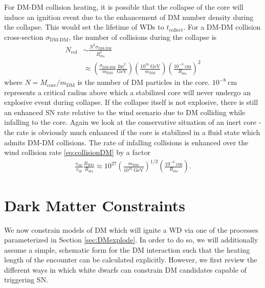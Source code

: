 \documentclass[preprintnumbers,amsmath,amssymb,prd, superscriptaddress,twocolumn]{revtex4}
\newcommand{\GeV}{\text{GeV}}
\def\r{\right)}
\def\l{\left(}
\begin{document}
For DM-DM collision heating, it is possible that the collapse of the core will induce an ignition event due to the enhancement of DM number density during the collapse.
This would set the lifetime of WDs to $t_\text{collect}$.
For a DM-DM collision cross-section $\sigma_\text{DM-DM}$, the number of collisions during the collapse is
\begin{align}
  N_\text{col} &\sim \frac{N^2 \sigma_\text{DM-DM}}{R_\text{sta}^2} \\
  &\approx \l \frac{\sigma_\text{DM-DM}}{m_\text{DM}}
  \frac{\text{fm}^2}{\GeV} \r
  \l \frac{10^{16}~\GeV}{m_\text{DM}} \r
  \l \frac{10^{-8}~\text{cm}}{R_\text{sta}} \r^2 \nonumber
\end{align}
where $N = M_\text{core}/m_\text{DM}$ is the number of DM particles in the core.
$10^{-8}~\text{cm}$ represents a critical radius above which a stabilized core will never undergo an explosive event during collapse.
If the collapse itself is not explosive, there is still an enhanced SN rate relative to the wind scenario due to DM colliding while infalling to the core. Again we look at the conservative situation of an inert core - the rate is obviously much enhanced if the core is stabilized in a fluid state which admits DM-DM collisions.
The rate of infalling collisions is enhanced over the wind collision rate \eqref{eq:collisionDM} by a factor
\begin{align}
  \frac{v_\text{esc}}{v_\text{th}} \frac{R_\text{WD}}{R_\text{sta}}
  \approx 10^{27} \l \frac{m_\text{DM}}{10^{16}~\GeV} \r^{1/2}
  \l \frac{10^{-8}~\text{cm}}{R_\text{sta}} \r.
\end{align}


\section{Dark Matter Constraints}
\label{sec:Constraints}

We now constrain models of DM which will ignite a WD via one of the processes parameterized in Section \ref{sec:DMexplode}.
In order to do so, we will additionally assume a simple, schematic form for the DM interaction such that the heating length of the encounter can be calculated explicitly.
However, we first review the different ways in which white dwarfs can constrain DM candidates capable of triggering SN.
\end{document}
